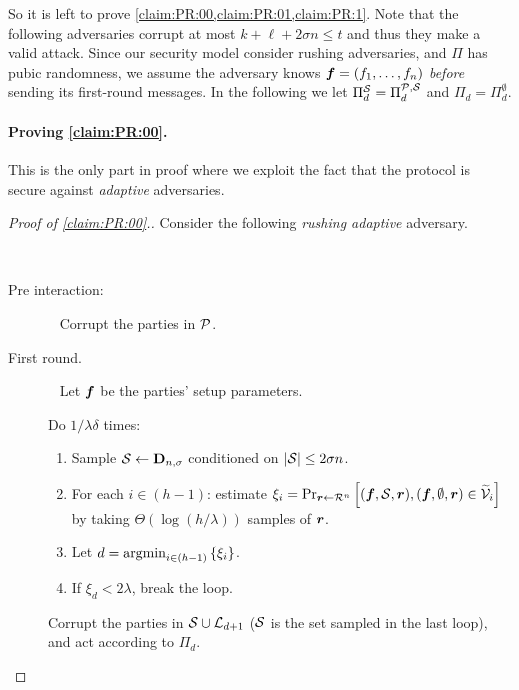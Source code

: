 \newcommand{\PPP}{\Pi^{\cS}}


So it is left to prove \cref{claim:PR:00,claim:PR:01,claim:PR:1}. Note that the following adversaries corrupt at most $k + \ell + 2\sigma n \le t$ and thus they make a valid attack. Since our security model consider rushing adversaries, and $\Pi$ has
pubic randomness, we assume the adversary knows ${ \boldsymbol{f}} = (f_1,\ldots,f_n)$ \emph{before} sending its first-round messages. In the following we let $\PPP_d = \PP_d$ and $\Pi_d = \Pi^{\emptyset}_d$.
\paragraph{Proving \cref{claim:PR:00}.}
This is the only part in proof where we exploit the fact that the protocol is secure against \emph{adaptive} adversaries.
\begin{proof}[Proof of \cref{claim:PR:00}.]
	

Consider the following \emph{rushing adaptive} adversary.

{ \samepage
\begin{algorithm}[$\Ac$]\label{alg:PR:00}~
		
\begin{description}
	
\item[Pre interaction:]~
Corrupt the parties in $\mathcal{P}$.

\item[First round.] ~
Let ${ \boldsymbol{f}}$ be the parties' setup parameters.

Do $1/\lambda\delta$ times:
\begin{enumerate}
	\item  Sample  $\mathcal{S} \gets \mathbf{D}_{n,\sigma} $ conditioned on $ \left|{\cal{S}}\right| \le 2\sigma n$.
	\item  	For each   $i\in (h-1)$: estimate $\xi_i =  \Pr_{{ \boldsymbol{r}} \gets \mathcal{R}^n}\left[({ \boldsymbol{f}},{\cal{S}},{ \boldsymbol{r}}),({ \boldsymbol{f}},\emptyset,{ \boldsymbol{r}})  \in \widetilde{\mathcal{V}}_{i}\right]$ by taking $\Theta( \log (h/ \lambda))$ samples of ${ \boldsymbol{r}}$.
	
	\item Let $d = \operatorname*{argmin}_{i\in (h-1)} \left\{\xi_i\right\}$.
			
	\item If $\xi_d < 2\lambda$, break the loop.

\end{enumerate}
			
        Corrupt the parties in ${\cal{S}} \cup {\cal{L}}_{d+1}$ (${\cal{S}}$ is the set sampled in the last loop), and act according to $\Pi_d$.
		

\end{description}
\end{algorithm}}
\end{proof}
